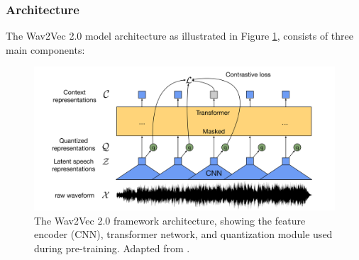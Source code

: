 \subsubsection{Architecture}

The Wav2Vec 2.0 model architecture as illustrated in Figure \ref{fig:wav2vec2_arch}, consists of three main components:

\begin{figure}[h!]
    \centering
    \includegraphics[width=1\textwidth]{obrazky-figures/wav2vec2/wav2vec2.pdf}
    \caption{The Wav2Vec 2.0 framework architecture, showing the feature encoder (CNN), transformer network, and quantization module used during pre-training. Adapted from \cite{baevski2020wav2vec20frameworkselfsupervised}.}
    \label{fig:wav2vec2_arch}
\end{figure}

